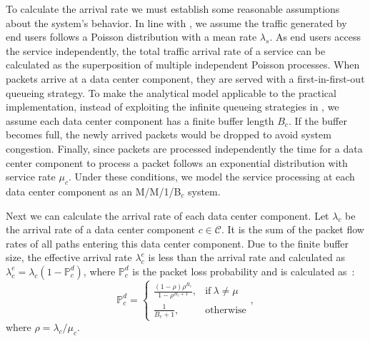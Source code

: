 To calculate the arrival rate we must establish some reasonable assumptions about the system's behavior. In line with \cite{PoissonTraffic}, we assume the traffic generated by end users follows a Poisson distribution with a mean rate $\lambda_s$. As end users access the service independently, the total traffic arrival rate of a service can be calculated as the superposition of multiple independent Poisson processes. When packets arrive at a data center component, they are served with a first-in-first-out queueing strategy. To make the analytical model applicable to the practical implementation, instead of exploiting the infinite queueing strategies in \cite{InfiniteQueue}, we assume each data center component has a finite buffer length $B_c$. If the buffer becomes full, the newly arrived packets would be dropped to avoid system congestion. Finally, since packets are processed independently the time for a data center component to process a packet follows an exponential distribution with service rate $\mu_c$. Under these conditions, we model the service processing at each data center component as an M/M/1/B$_c$ system.

Next we can calculate the arrival rate of each data center component. Let $\lambda_c$ be the arrival rate of a data center component $c\in\mathcal{C}$. It is the sum of the packet flow rates of all paths entering this data center component. Due to the finite buffer size, the effective arrival rate $\lambda_c^e$ is less than the arrival rate and calculated as $\lambda _{ c }^{ e }=\lambda _{ c }{ \left( 1-\mathbb{P}^d_{c} \right)  }$, where $\mathbb{P}^d_{c}$ is the packet loss probability and is calculated as~\cite{Kleinrock75}:
\begin{equation}
    \mathbb{P}^d_{c}
	=
	\begin{cases}
		\frac{(1-\rho)\rho^{B_c}}{1-\rho^{B_c+1}}, & \text{if}\ \lambda\neq\mu\\
        \frac{1}{B_{c}+1}, & \text{otherwise}
	\end{cases},
	\label{eq:pl}
\end{equation}
where $\rho=\lambda_{c}/\mu_{c}$.

